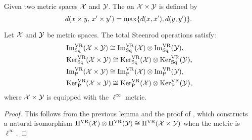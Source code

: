 Given two metric spaces $\cX$ and $\cY$.
The  on $\cX \times \cY$ is defined by
\[
d(x \times y, \, x' \times y') = \max\set{d(x,x'), d(y,y')}.
\]

\medskip\theorem
Let $\cX$ and $\cY$ be metric spaces.
The total Steenrod operations satisfy:
\begin{align*}
	&\img^{\VR}_\Sq(\cX \times \cY) \cong \img^{\VR}_\Sq(\cX) \ot \img^{\VR}_\Sq(\cY), \\
	&\ker^{\VR}_\Sq(\cX \times \cY) \cong \ker^{\VR}_\Sq(\cX) \ot \ker^{\VR}_\Sq(\cY), \\
	&\img^{\VR}_\rP(\cX \times \cY) \cong \img^{\VR}_\rP(\cX) \ot \img^{\VR}_\rP(\cY), \\
	&\ker^{\VR}_\rP(\cX \times \cY) \cong \ker^{\VR}_\rP(\cX) \ot \ker^{\VR}_\rP(\cY),
\end{align*}
where \(\cX \times \cY\) is equipped with the \(\ell^\infty\) metric.


\begin{proof}
	This follows from the previous lemma and the proof of \cite[Thm.~6.1(1)]{lim2020vietoris}, which constructs a natural isomorphism $\rH^\VR(\cX) \ot \rH^\VR(\cY) \cong \rH^\VR(\cX \times \cY)$ when the metric is \(\ell^\infty\).
\end{proof}